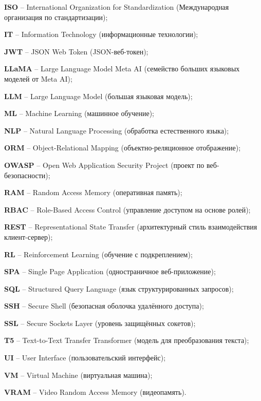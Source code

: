 \par \textbf{ISO} – International Organization for Standardization (Международная организация по стандартизации);
\par \textbf{IT} – Information Technology (информационные технологии);
\par \textbf{JWT} – JSON Web Token (JSON-веб-токен);
\par \textbf{LLaMA} – Large Language Model Meta AI (семейство больших языковых моделей от Meta AI);
\par \textbf{LLM} – Large Language Model (большая языковая модель);
\par \textbf{ML} – Machine Learning (машинное обучение);
\par \textbf{NLP} – Natural Language Processing (обработка естественного языка);
\par \textbf{ORM} – Object-Relational Mapping (объектно-реляционное отображение);
\par \textbf{OWASP} – Open Web Application Security Project (проект по веб-безопасности);
\par \textbf{RAM} – Random Access Memory (оперативная память);
\par \textbf{RBAC} – Role-Based Access Control (управление доступом на основе ролей);
\par \textbf{REST} – Representational State Transfer (архитектурный стиль взаимодействия клиент-сервер);
\par \textbf{RL} – Reinforcement Learning (обучение с подкреплением);
\par \textbf{SPA} – Single Page Application (одностраничное веб-приложение);
\par \textbf{SQL} – Structured Query Language (язык структурированных запросов);
\par \textbf{SSH} – Secure Shell (безопасная оболочка удалённого доступа);
\par \textbf{SSL} – Secure Sockets Layer (уровень защищённых сокетов);
\par \textbf{T5} – Text-to-Text Transfer Transformer (модель для преобразования текста);
\par \textbf{UI} – User Interface (пользовательский интерфейс);
\par \textbf{VM} – Virtual Machine (виртуальная машина);
\par \textbf{VRAM} – Video Random Access Memory (видеопамять).